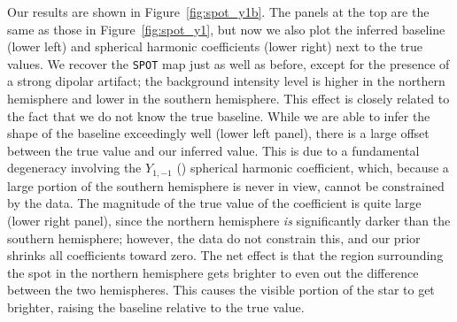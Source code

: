 \documentclass[modern]{aastex631}
\begin{document}

Our results are shown in Figure~\ref{fig:spot_y1b}. 
The panels at the top are the same as those in Figure~\ref{fig:spot_y1}, but now we also plot the inferred baseline (lower left) and spherical harmonic coefficients (lower right) next to the true values. 
We recover the \texttt{SPOT} map just as well as before, except for the presence of a strong dipolar artifact; the background intensity level is higher in the northern hemisphere and lower in the southern hemisphere. 
This effect is closely related to the fact that we do not know the true baseline. 
While we are able to infer the shape of the baseline exceedingly well (lower left panel), there is a large offset between the true value and our inferred value. 
This is due to a fundamental degeneracy involving the $Y_{1,-1}$ () spherical harmonic coefficient, which, because a large portion of the southern hemisphere is never in view, cannot be constrained by the data. 
The magnitude of the true value of the coefficient is quite large (lower right panel), since the northern hemisphere \emph{is} significantly darker than the southern hemisphere; however, the data do not constrain this, and our prior shrinks all coefficients toward zero. 
The net effect is that the region surrounding the spot in the northern hemisphere gets brighter to even out the difference between the two hemispheres. 
This causes the visible portion of the star to get brighter, raising the baseline relative to the true value.
\end{document}
